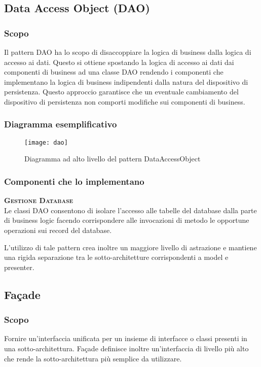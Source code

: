 \subsection{Data Access Object (DAO)}

\subsubsection{Scopo}
Il pattern DAO ha lo scopo di disaccoppiare la logica di business dalla logica di accesso ai dati. Questo si ottiene spostando la logica di accesso ai dati dai componenti di business ad una classe DAO rendendo i componenti che implementano la logica di business indipendenti dalla natura del dispositivo di persistenza. Questo approccio garantisce che un eventuale cambiamento del dispositivo di persistenza non comporti modifiche sui componenti di business.

\subsubsection{Diagramma esemplificativo}
\begin{figure}[H]
\centering
\texttt{[image: dao]}
\caption{Diagramma ad alto livello del pattern DataAccessObject}\label{fig:dao}
\end{figure}

\subsubsection{Componenti che lo implementano}
\begin{description}
\item{\scshape\bfseries Gestione Database}\\
Le classi DAO consentono di isolare l'accesso alle tabelle del database dalla parte di business logic facendo corrispondere alle invocazioni di metodo le opportune operazioni sui record del database.

L'utilizzo di tale pattern crea inoltre un maggiore livello di astrazione e mantiene una rigida separazione tra le sotto-architetture corrispondenti a model e presenter.
\end{description}

\subsection{Façade}

\subsubsection{Scopo}
Fornire un'interfaccia unificata per un insieme di interfacce o classi presenti in una sotto-architettura. Façade definisce inoltre un'interfaccia di livello più alto che rende la sotto-architettura più semplice da utilizzare.

